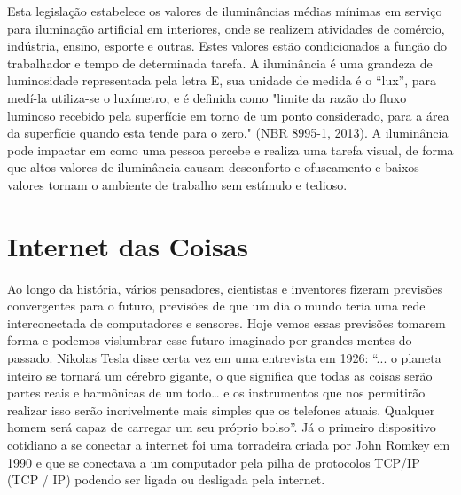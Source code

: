 Esta legislação estabelece os valores de iluminâncias médias mínimas em serviço para iluminação artificial em interiores, onde se realizem atividades de comércio, indústria, ensino, esporte e outras. Estes valores estão condicionados a função do trabalhador e tempo de determinada tarefa. A iluminância é uma grandeza de luminosidade representada pela letra E, sua unidade de medida é o “lux”, para medí-la utiliza-se o luxímetro, e é definida como  "limite da razão do fluxo luminoso recebido pela superfície em torno de um ponto considerado, para a área da superfície quando esta tende para o zero." (NBR 8995-1, 2013).  A iluminância pode impactar em como uma pessoa percebe e realiza uma tarefa visual, de forma que altos valores de iluminância causam desconforto e ofuscamento e baixos valores tornam o ambiente de trabalho sem estímulo e tedioso.


\section{Internet das Coisas}

Ao longo da história, vários pensadores, cientistas e inventores fizeram previsões convergentes para o futuro, previsões de que um dia o mundo teria uma rede interconectada de computadores e sensores. Hoje vemos essas previsões tomarem forma e podemos vislumbrar esse futuro imaginado por grandes mentes do passado. Nikolas Tesla disse certa vez em uma entrevista em 1926: “... o planeta inteiro se tornará um cérebro gigante, o que significa que todas as coisas serão partes reais e harmônicas de um todo… e os instrumentos que nos permitirão realizar isso serão incrivelmente mais simples que os telefones atuais. Qualquer homem será capaz de carregar um seu próprio bolso”. Já o primeiro dispositivo cotidiano a se conectar a internet foi uma torradeira criada por John Romkey em 1990 e que se conectava a um computador pela pilha de protocolos TCP/IP (\acl{TCP} / \acl{IP}) podendo ser ligada ou desligada pela internet.

